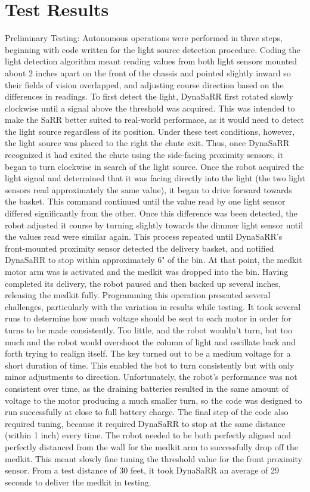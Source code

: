  \section{Test Results}
 
Preliminary Testing: Autonomous operations were performed in three steps, beginning with code written for the light source detection procedure. Coding the light detection algorithm meant reading values from both light sensors mounted about 2 inches apart on the front of the chassis and pointed slightly inward so their fields of vision overlapped, and adjusting course direction based on the differences in readings. To first detect the light, DynaSaRR first rotated slowly clockwise until a signal above the threshold was acquired. This was intended to make the SaRR better suited to real-world performace, as it would need to detect the light source regardless of its position. Under these test conditions, however, the light source was placed to the right the chute exit. Thus, once DynaSaRR recognized it had exited the chute using the side-facing proximity sensors, it began to turn clockwise in search of the light source. Once the robot acquired the light signal and determined that it was facing directly into the light (the two light sensors read approximately the same value), it began to drive forward towards the basket. This command continued until the value read by one light sensor differed significantly from the other. Once this difference was been detected, the robot adjusted it course by turning slightly towards the dimmer light sensor until the values read were similar again. This process repeated until DynaSaRR's front-mounted proximity sensor detected the delivery basket, and notified DynaSaRR to stop within approximately 6" of the bin. At that point, the medkit motor arm was is activated and the medkit was dropped into the bin. Having completed its delivery, the robot paused and then backed up several inches, releasing the medkit fully. Programming this operation presented several challenges, particularly with the variation in results while testing. It took several runs to determine how much voltage should be sent to each motor in order for turns to be made consistently. Too little, and the robot wouldn't turn, but too much and the robot would overshoot the column of light and oscillate back and forth trying to realign itself. The key turned out to be a medium voltage for a short duration of time. This enabled the bot to turn consistently but with only minor adjustments to direction. Unfortunately, the robot's performance was not consistent over time, as the draining batteries resulted in the same amount of voltage to the motor producing a much smaller turn, so the code was designed to run successfully at close to full battery charge. The final step of the code also required tuning, because it required DynaSaRR to stop at the same distance (within 1 inch) every time. The robot needed to be both perfectly aligned and perfectly distanced from the wall for the medkit arm to successfully drop off the medkit. This meant slowly fine tuning the threshold value for the front proximity sensor. From a test distance of 30 feet, it took DynaSaRR an average of 29 seconds to deliver the medkit in testing.

